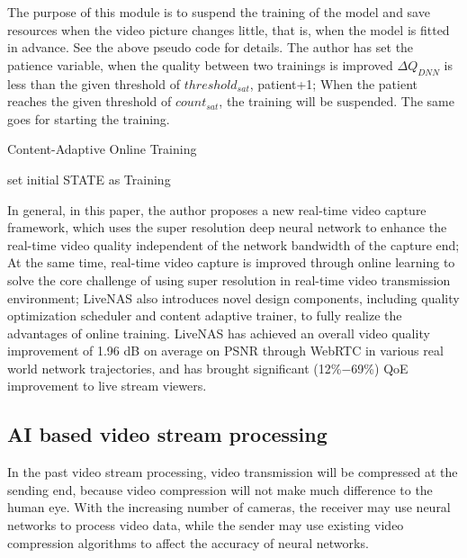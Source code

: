 \documentclass[conference]{IEEEtran}
\begin{document}
The purpose of this module is to suspend the training of the model and save resources when the video picture changes little, that is, when the model is fitted in advance. See the above pseudo code for details. The author has set the patience variable, when the quality between two trainings is improved $\Delta Q_{DNN}$ is less than the given threshold of $threshold_{sat}$, patient+1; When the patient reaches the given threshold of $count_{sat}$, the training will be suspended. The same goes for starting the training.
\begin{algorithm}[!h]{ %
	\caption{Content-Adaptive Online Training}%
	\LinesNumbered %
	set initial STATE as Training\;
    }
\end{algorithm}

In general, in this paper, the author proposes a new real-time video capture framework, which uses the super resolution deep neural network to enhance the real-time video quality independent of the network bandwidth of the capture end; At the same time, real-time video capture is improved through online learning to solve the core challenge of using super resolution in real-time video transmission environment; LiveNAS also introduces novel design components, including quality optimization scheduler and content adaptive trainer, to fully realize the advantages of online training. LiveNAS has achieved an overall video quality improvement of 1.96 dB on average on PSNR through WebRTC in various real world network trajectories, and has brought significant (12\%$-$69\%) QoE improvement to live stream viewers.

\subsection{AI based video stream processing}
In the past video stream processing, video transmission will be compressed at the sending end, because video compression will not make much difference to the human eye. With the increasing number of cameras, the receiver may use neural networks to process video data, while the sender may use existing video compression algorithms to affect the accuracy of neural networks.
\end{document}

